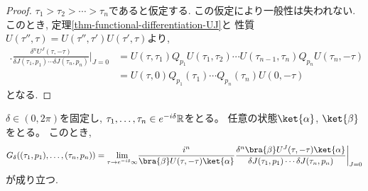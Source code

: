 \begin{proof}
  $\tau_1 > \tau_2 > \cdots > \tau_n$であると仮定する.
  この仮定により一般性は失われない.
  このとき, 定理\ref{thm-functional-differentiation-UJ}と
  性質$U(\tau'',\tau)=U(\tau'',\tau')U(\tau',\tau)$より,
  \begin{align*}
    \biggl.\frac{\delta^n U^J(\tau, -\tau)}{\delta J(\tau_1,p_1) \cdots \delta J(\tau_n,p_n)}\biggr|_{J = 0} &=
    U(\tau,\tau_1)Q_{p_1}U(\tau_1,\tau_2)\cdots U(\tau_{n-1},\tau_n)Q_{p_n}U(\tau_n,-\tau) \\ &=
    U(\tau,0)Q_{p_1}(\tau_1)\cdots Q_{p_n}(\tau_n)U(0,-\tau)
  \end{align*}
  となる.
\end{proof}

\begin{thm}
  \label{Green-function-generating-formula}
  $\delta \in (0, 2\pi)$を固定し,
  $\tau_1, \ldots, \tau_n \in e^{-i\delta}\mathbb{R}$をとる。
  任意の状態$\ket{\alpha}$, $\ket{\beta}$をとる。
  このとき,
  \begin{equation}
    G_\delta((\tau_1,p_1),\ldots,(\tau_n,p_n)) =
    \lim_{\tau\to e^{-i\delta}\infty}
    \biggl.
    \frac{i^n}{\bra{\beta}U(\tau,-\tau)\ket{\alpha}}
    \frac{\delta^n \bra{\beta}U^J(\tau, -\tau)\ket{\alpha}}{\delta J(\tau_1,p_1)
    \cdots
    \delta J(\tau_n,p_n)}
    \biggr|_{J=0}
  \end{equation}
  が成り立つ.
\end{thm}

